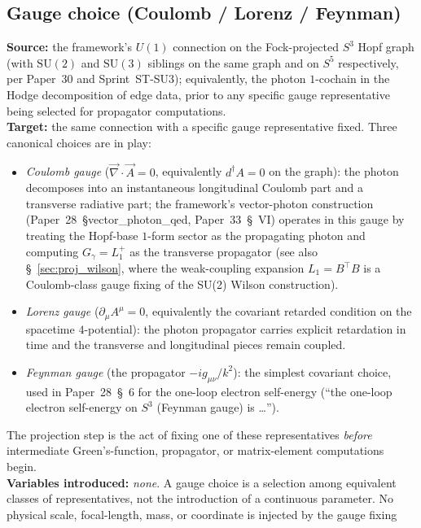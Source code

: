\subsection{Gauge choice (Coulomb / Lorenz / Feynman)}
\label{sec:proj_gauge_choice}
\textbf{Source:} the framework's $U(1)$ connection on the Fock-projected
$S^3$ Hopf graph (with $\mathrm{SU}(2)$ and $\mathrm{SU}(3)$ siblings
on the same graph and on $S^5$ respectively, per Paper~30 and
Sprint~ST-SU3); equivalently, the photon $1$-cochain in the Hodge
decomposition of edge data, prior to any specific gauge representative
being selected for propagator computations.\\
\textbf{Target:} the same connection with a specific gauge
representative fixed.  Three canonical choices are in play:
\begin{itemize}\setlength{\itemsep}{2pt}
\item \emph{Coulomb gauge} ($\vec{\nabla} \cdot \vec{A} = 0$,
equivalently $d^\dagger A = 0$ on the graph): the photon decomposes
into an instantaneous longitudinal Coulomb part and a transverse
radiative part; the framework's vector-photon construction
(Paper~28~\S vector\_photon\_qed, Paper~33~\S~VI) operates in this
gauge by treating the Hopf-base $1$-form sector as the propagating
photon and computing $G_\gamma = L_1^+$ as the transverse propagator
(see also \S~\ref{sec:proj_wilson}, where the weak-coupling expansion
$L_1 = B^\top B$ is a Coulomb-class gauge fixing of the SU(2) Wilson
construction).
\item \emph{Lorenz gauge} ($\partial_\mu A^\mu = 0$, equivalently the
covariant retarded condition on the spacetime $4$-potential): the
photon propagator carries explicit retardation in time and the
transverse and longitudinal pieces remain coupled.
\item \emph{Feynman gauge} (the propagator $-i g_{\mu\nu}/k^2$): the
simplest covariant choice, used in Paper~28~\S~6 for the one-loop
electron self-energy (``the one-loop electron self-energy on $S^3$
(Feynman gauge) is \ldots'').
\end{itemize}
The projection step is the act of fixing one of these representatives
\emph{before} intermediate Green's-function, propagator, or matrix-element
computations begin.\\
\textbf{Variables introduced:} \emph{none}.  A gauge choice is a
selection among equivalent classes of representatives, not the
introduction of a continuous parameter.  No physical scale,
focal-length, mass, or coordinate is injected by the gauge fixing
